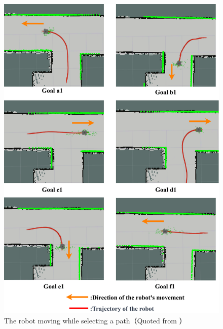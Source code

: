 \begin{figure}[htbp]
    \centering
     \includegraphics[width=130mm]{images/pdf/zyuziroute-select_a.pdf}
     \caption[The robot moving while selecting a path]{The robot moving while selecting a path（Quoted from \cite{haruyama2022}）}
     \label{fig:haru_mech_a_select}
\end{figure}
